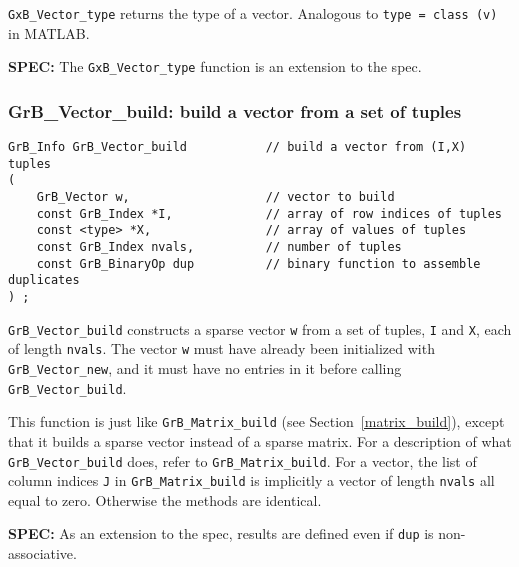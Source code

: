 \documentclass[12pt]{article}
\begin{document}
\verb'GxB_Vector_type' returns the type of a vector.  Analogous to
\verb'type = class (v)' in MATLAB.

\begin{spec}
{\bf SPEC:} The \verb'GxB_Vector_type' function is an extension to the spec.
\end{spec}

\subsubsection{{\sf GrB\_Vector\_build:}         build a vector from a set of tuples}
\label{vector_build}

\begin{mdframed}[userdefinedwidth=6in]
{\footnotesize
\begin{verbatim}
GrB_Info GrB_Vector_build           // build a vector from (I,X) tuples
(
    GrB_Vector w,                   // vector to build
    const GrB_Index *I,             // array of row indices of tuples
    const <type> *X,                // array of values of tuples
    const GrB_Index nvals,          // number of tuples
    const GrB_BinaryOp dup          // binary function to assemble duplicates
) ;
\end{verbatim}
} \end{mdframed}

\verb'GrB_Vector_build' constructs a sparse vector \verb'w' from a set of
tuples, \verb'I' and \verb'X', each of length \verb'nvals'.  The vector
\verb'w' must have already been initialized with \verb'GrB_Vector_new', and it
must have no entries in it before calling \verb'GrB_Vector_build'.

This function is just like \verb'GrB_Matrix_build' (see
Section~\ref{matrix_build}), except that it builds a sparse vector instead of a
sparse matrix.  For a description of what \verb'GrB_Vector_build' does, refer
to \verb'GrB_Matrix_build'.  For a vector, the list of column indices \verb'J'
in \verb'GrB_Matrix_build' is implicitly a vector of length \verb'nvals' all
equal to zero.  Otherwise the methods are identical.

\begin{spec}
{\bf SPEC:} As an extension to the spec, results are defined even if \verb'dup' is non-associative.
\end{spec}

\newpage
\end{document}
